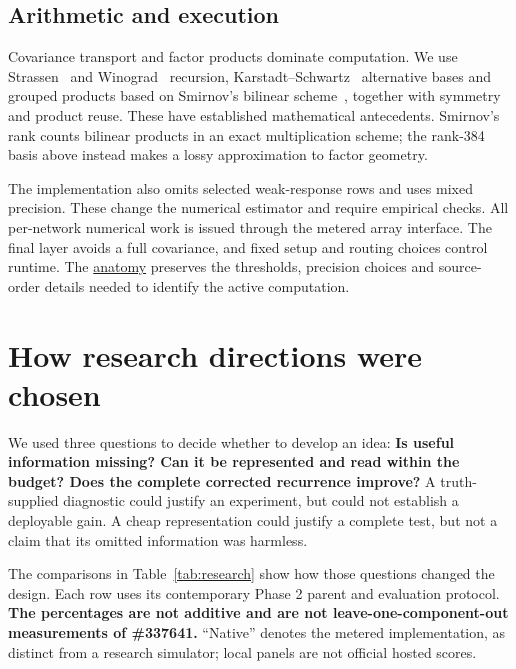 \documentclass[11pt,letterpaper]{article}
\begin{document}
\subsection{Arithmetic and execution}\label{arithmetic-and-execution}

Covariance transport and factor products dominate computation. We use Strassen~\cite{ref-strassen} and Winograd~\cite{ref-winograd} recursion, Karstadt--Schwartz~\cite{ref-karstadt} alternative bases and grouped products based on Smirnov's bilinear scheme~\cite{ref-smirnov}, together with symmetry and product reuse. These have established mathematical antecedents. Smirnov's rank counts bilinear products in an exact multiplication scheme; the rank-384 basis above instead makes a lossy approximation to factor geometry.

The implementation also omits selected weak-response rows and uses mixed precision. These change the numerical estimator and require empirical checks. All per-network numerical work is issued through the metered array interface. The final layer avoids a full covariance, and fixed setup and routing choices control runtime. The \href{https://github.com/mattliston/arc-whitebox-estimation-challenge/blob/main/estimator/ANATOMY.md\#arithmetic-routes-and-worker-lifecycle}{anatomy} preserves the thresholds, precision choices and source-order details needed to identify the active computation.

\section{How research directions were chosen}\label{how-research-directions-were-chosen}

We used three questions to decide whether to develop an idea: \textbf{Is useful information missing? Can it be represented and read within the budget? Does the complete corrected recurrence improve?} A truth-supplied diagnostic could justify an experiment, but could not establish a deployable gain. A cheap representation could justify a complete test, but not a claim that its omitted information was harmless.

The comparisons in Table~\ref{tab:research} show how those questions changed the design. Each row uses its contemporary Phase 2 parent and evaluation protocol. \textbf{The percentages are not additive and are not leave-one-component-out measurements of \#337641.} ``Native'' denotes the metered implementation, as distinct from a research simulator; local panels are not official hosted scores.
\end{document}
